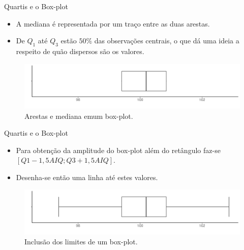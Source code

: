 \documentclass[
  ignorenonframetext,
  serif,
  professionalfont,
  usenames,
  dvipsnames,
  aspectratio = 169]{beamer}
\begin{document}
\begin{frame}{Quartis e o Box-plot}
\protect\hypertarget{quartis-e-o-box-plot-2}{}
\begin{itemize}
\item
  A mediana é representada por um traço entre as duas arestas.
\item
  De \(Q_1\) até \(Q_3\) estão \(50\%\) das observações centrais, o que
  dá uma ideia a respeito de quão dispersos são os valores.
\end{itemize}

\begin{figure}

{\centering \includegraphics[width=0.9\linewidth]{./img/boxplot2} 

}

\caption{Arestas e mediana emum box-plot.}\label{fig:unnamed-chunk-10}
\end{figure}
\end{frame}

\begin{frame}{Quartis e o Box-plot}
\protect\hypertarget{quartis-e-o-box-plot-3}{}
\begin{itemize}
\item
  Para obtenção da amplitude do box-plot além do retângulo faz-se
  \([Q1-1,5AIQ; Q3+1,5AIQ]\).
\item
  Desenha-se então uma linha até estes valores.
\end{itemize}

\begin{figure}

{\centering \includegraphics[width=0.9\linewidth]{./img/boxplot3} 

}

\caption{Inclusão dos limites de um box-plot.}\label{fig:unnamed-chunk-11}
\end{figure}
\end{frame}
\end{document}
